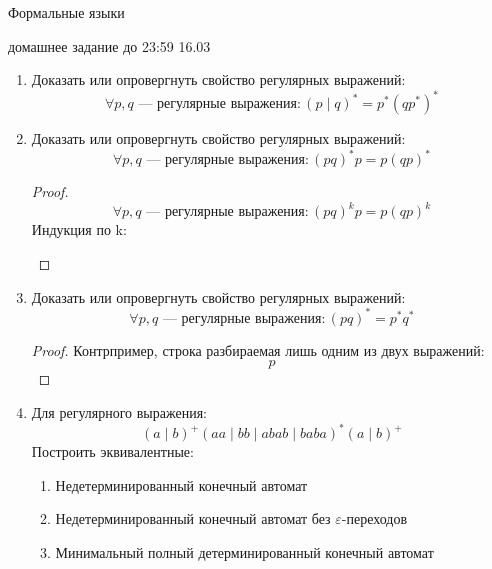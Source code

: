 \documentclass[12pt]{article}
\begin{document}
\begin{center} {\LARGE Формальные языки} \end{center}

\begin{center} \Large домашнее задание до 23:59 16.03 \end{center}
\bigskip

\begin{enumerate}
  \item Доказать или опровергнуть свойство регулярных выражений:
  \[
    \forall p, q \text{ --- регулярные выражения}: (p \mid q)^* = p^*(qp^*)^*
  \]

  \item Доказать или опровергнуть свойство регулярных выражений:
  \[
    \forall p, q \text{ --- регулярные выражения}: (p q)^* p = p (q p)^*
  \]

  \begin{proof}

    \[
      \forall p, q \text{ --- регулярные выражения}: (p q)^k p = p (q p)^k
    \]
    Индукция по k:
    \[\]
  \end{proof}
  \item Доказать или опровергнуть свойство регулярных выражений:
  \[
    \forall p, q \text{ --- регулярные выражения}: (p q)^* = p^* q^*
  \]

  \begin{proof}
    Контрпример, строка разбираемая лишь одним из двух выражений:
    \[
      p
    \]

  \end{proof}

  \item Для регулярного выражения:
   \[ (a \mid b)^+ (aa \mid bb \mid abab \mid baba)^* (a \mid b)^+\]
  Построить эквивалентные:
  \begin{enumerate}
    \item Недетерминированный конечный автомат
    \item Недетерминированный конечный автомат без $\varepsilon$-переходов
    \item Минимальный полный детерминированный конечный автомат
  \end{enumerate}

\end{enumerate}
\end{document}
